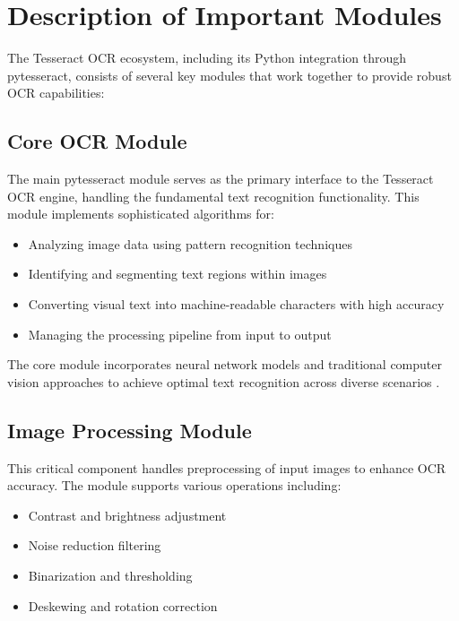 \section{Description of Important Modules}

The Tesseract OCR ecosystem, including its Python integration through pytesseract, consists of several key modules that work together to provide robust OCR capabilities:

\subsection{Core OCR Module}
\label{subsec:core_ocr}

The main pytesseract module serves as the primary interface to the Tesseract OCR engine, handling the fundamental text recognition functionality. This module implements sophisticated algorithms for:

\begin{itemize}
	\item Analyzing image data using pattern recognition techniques
	\item Identifying and segmenting text regions within images
	\item Converting visual text into machine-readable characters with high accuracy
	\item Managing the processing pipeline from input to output
\end{itemize}

The core module incorporates neural network models and traditional computer vision approaches to achieve optimal text recognition across diverse scenarios \cite{Nutrient:2025}.


\subsection{Image Processing Module}
\label{subsec:image_processing}

This critical component handles preprocessing of input images to enhance OCR accuracy. The module supports various operations including:

\begin{itemize}
	\item Contrast and brightness adjustment
	\item Noise reduction filtering
	\item Binarization and thresholding
	\item Deskewing and rotation correction
\end{itemize}

